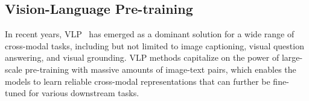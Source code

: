\documentclass[letterpaper]{article} %
\begin{document}

\subsection{Vision-Language Pre-training}
In recent years, VLP~\cite{lu2019vilbert, li2022blip} has emerged as a dominant solution for a wide range of cross-modal tasks, including but not limited to image captioning, visual question answering, and visual grounding. VLP methods capitalize on the power of large-scale pre-training with massive amounts of image-text pairs, which enables the models to learn reliable cross-modal representations that can further be fine-tuned for various downstream tasks.
\end{document}
